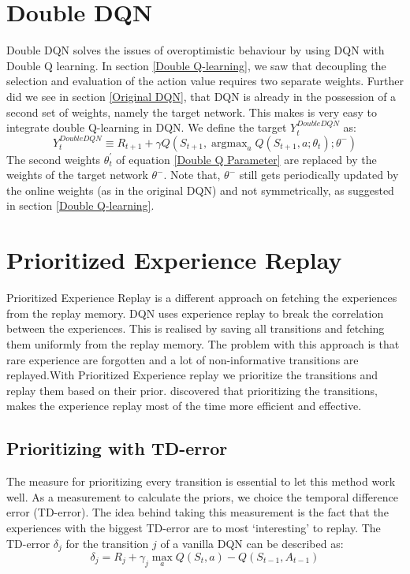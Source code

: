 \documentclass{sig-alternate}
\DeclareMathOperator*{\argmax}{argmax} %
\begin{document}
\section{Double DQN}

Double DQN solves the issues of overoptimistic behaviour by using DQN with Double Q learning.
In section \ref{Double Q-learning}, we saw that decoupling the selection and evaluation of the action value requires two separate weights. Further did we see in section \ref{Original DQN}, that DQN is already in the possession of a second set of weights, namely the target network. This makes is very easy to integrate double Q-learning in DQN. We define the target $Y_{t}^{Double DQN}$ as:
\begin{equation}
\label{Double DQN}
Y_{t}^{Double DQN} \equiv R_{t+1} + \gamma Q(S_{t+1},\argmax _{a}Q(S_{t+1},a;\theta_{t});\theta^{-})
\end{equation}
The second weights $\theta_{t}^{'}$ of equation \ref{Double Q Parameter} are replaced by the weights of the target network $\theta^{-}$. Note that, $\theta^{-}$ still gets periodically updated by the online weights (as in the original DQN) and not symmetrically, as suggested in section \ref{Double Q-learning}. \\

\section{Prioritized Experience Replay}\label{Prioritized Experience Replay}

Prioritized Experience Replay is a different approach on fetching the experiences from the replay memory. DQN uses experience replay to break the correlation between the experiences. This is realised by saving all transitions and fetching them uniformly from the replay memory. The problem with this approach is that rare experience are forgotten and a lot of non-informative transitions are replayed.With Prioritized Experience replay we prioritize the transitions  and replay them based on their prior. \cite{schaul2015prioritized} discovered that prioritizing the transitions, makes the experience replay most of the time more efficient and effective.  

\subsection{Prioritizing with TD-error}

The measure for prioritizing every transition is essential to let this method work well. As a measurement to calculate the priors, we choice the temporal difference error (TD-error). The idea behind taking this measurement is the fact that the experiences with the biggest TD-error are to most `interesting' to replay. The TD-error $\delta_{j}$ for the transition $j$ of a vanilla DQN can be described as: 
\begin{equation}
\label{Transitions}
\delta_{j} = R_{j} + \gamma_j \max_{a}Q(S_{t},a)-Q(S_{t-1},A_{t-1})
\end{equation}
\end{document}
